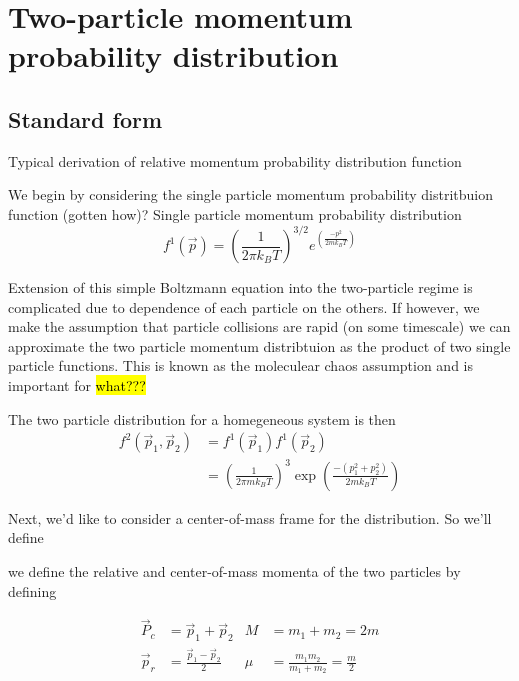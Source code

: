 \chapter{Two-particle momentum probability distribution}
\label{ch:momDistDer}

\section{Standard form}
\label{sec:standardDist}

Typical derivation of relative momentum probability distribution function

We begin by considering the single particle momentum probability distritbuion function (gotten how)? 
Single particle momentum probability distribution
\begin{equation} 
\label{eq:single_particle_prob}
		 f^1( \vec{p} ) = \left(\frac{1}{2 \pi k_B T}\right)^{3/2} e^{\left(\frac{-p^2}{2 m k_B T}\right)}
\end{equation}

\noindent
Extension of this simple Boltzmann equation into the two-particle regime is complicated due to dependence of each particle on the others. If however, we make the assumption that particle collisions are rapid (on some timescale) we can approximate the two particle momentum distribtuion as the product of two single particle functions. This is known as the moleculear chaos assumption and is important for \hl{what???}

The two particle distribution for a homegeneous system is then
\begin{equation}
\label{eq:two_particle_prob}
\begin{split}
		 f^2( \vec{p}_1, \vec{p}_2 ) &= f^1( \vec{p}_1 ) f^1( \vec{p}_2 ) \\
		  &= \left(\frac{1}{2 \pi m k_B T}\right)^3 \exp\left(\frac{-(p_1^2 + p_2^2)}{2 m k_B T}\right)
\end{split}
\end{equation}

Next, we'd like to consider a center-of-mass frame for the distribution. So we'll define

 we define the relative and center-of-mass momenta of the two particles by defining

\begin{align*}
	\vec{P}_c & = \vec{p}_1 + \vec{p}_2             &	M   &= m_1 + m_2 = 2m \\
	\vec{p}_r & = \frac{\vec{p}_1 - \vec{p}_2}{2}   &   \mu &= \frac{m_1 m_2}{m_1 + m_2} = \frac{m}{2}
\end{align*}

